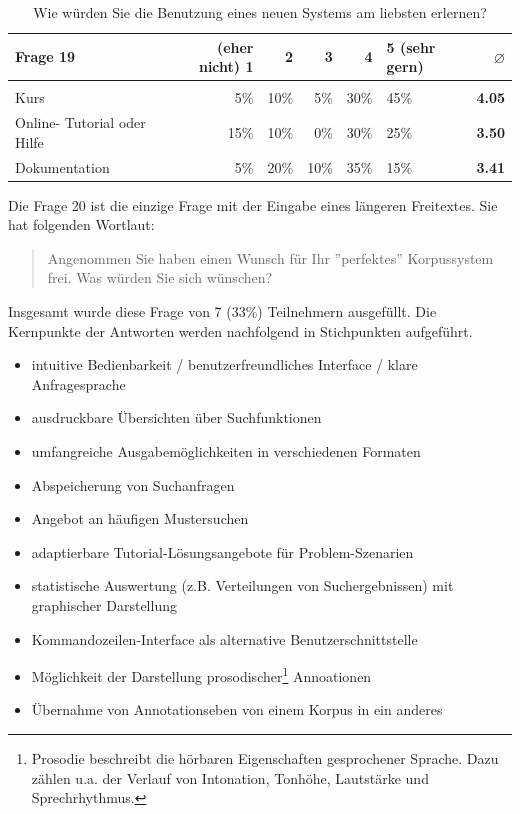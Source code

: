 	\begin{table}[H]
		\centering
		\begin{tabular}{l | r r r r l | r}
					Frage 19 & (eher nicht) 1 & 2 & 3 & 4 & 5 (sehr gern) & \bf{$\varnothing$} \\
					\hline\\
					Kurs 						& 5\% 	 &   10\%        & 5\%            & 30\%       & 45\% & \bf{4.05} \\
					Online- Tutorial oder Hilfe  	& 15\%        & 10\%      & 0\%          	& 30\%         & 25\% & \bf{3.50}\\
					Dokumentation 			& 5\%        & 20\%        & 10\% 		& 35\% & 15\% & \bf{3.41}
		\end{tabular}
		\caption{Wie würden Sie die Benutzung eines neuen Systems am liebsten erlernen?}\label{tab:Frage19}
	\end{table}
	
Die Frage 20 ist die einzige Frage mit der Eingabe eines längeren Freitextes. Sie hat folgenden Wortlaut:

\begin{quote}
Angenommen Sie haben einen Wunsch für Ihr ''perfektes'' Korpussystem frei. Was würden Sie sich wünschen?
\end{quote}

Insgesamt wurde diese Frage von 7 (33\%) Teilnehmern ausgefüllt. Die Kernpunkte der Antworten werden nachfolgend in Stichpunkten aufgeführt.

\begin{itemize}
	\item{intuitive Bedienbarkeit / benutzerfreundliches Interface / klare Anfragesprache}
	\item{ausdruckbare Übersichten über Suchfunktionen}
	\item{umfangreiche Ausgabemöglichkeiten in verschiedenen Formaten}
	\item{Abspeicherung von Suchanfragen}
	\item{Angebot an häufigen Mustersuchen}
	\item{adaptierbare Tutorial-Lösungsangebote für Problem-Szenarien}
	\item{statistische Auswertung (z.B. Verteilungen von Suchergebnissen) mit graphischer Darstellung}
	\item{Kommandozeilen-Interface als alternative Benutzerschnittstelle}
	\item{Möglichkeit der Darstellung prosodischer\footnote{Prosodie beschreibt die hörbaren Eigenschaften gesprochener Sprache. Dazu zählen u.a. der Verlauf von Intonation, Tonhöhe, Lautstärke und Sprechrhythmus.} Annoationen}
	\item{Übernahme von Annotationseben von einem Korpus in ein anderes}
\end{itemize}

